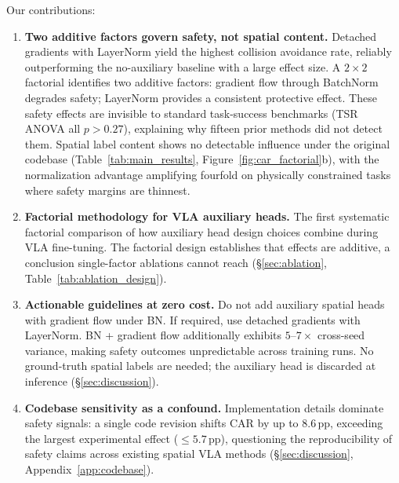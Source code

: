 Our contributions:
\begin{enumerate}[nosep,leftmargin=*]
    \item \textbf{Two additive factors govern safety, not spatial content.} Detached gradients with LayerNorm yield the highest collision avoidance rate, reliably outperforming the no-auxiliary baseline with a large effect size. A $2{\times}2$ factorial identifies two additive factors: gradient flow through BatchNorm degrades safety; LayerNorm provides a consistent protective effect. These safety effects are invisible to standard task-success benchmarks (TSR ANOVA all $p{>}0.27$), explaining why fifteen prior methods did not detect them. Spatial label content shows no detectable influence under the original codebase (Table~\ref{tab:main_results}, Figure~\ref{fig:car_factorial}b), with the normalization advantage amplifying fourfold on physically constrained tasks where safety margins are thinnest.

    \item \textbf{Factorial methodology for VLA auxiliary heads.} The first systematic factorial comparison of how auxiliary head design choices combine during VLA fine-tuning. The factorial design establishes that effects are additive, a conclusion single-factor ablations cannot reach (\S\ref{sec:ablation}, Table~\ref{tab:ablation_design}).

    \item \textbf{Actionable guidelines at zero cost.} Do not add auxiliary spatial heads with gradient flow under BN. If required, use detached gradients with LayerNorm. BN + gradient flow additionally exhibits $5$--$7{\times}$ cross-seed variance, making safety outcomes unpredictable across training runs. No ground-truth spatial labels are needed; the auxiliary head is discarded at inference (\S\ref{sec:discussion}).

    \item \textbf{Codebase sensitivity as a confound.} Implementation details dominate safety signals: a single code revision shifts CAR by up to 8.6\,pp, exceeding the largest experimental effect (${\leq}5.7$\,pp), questioning the reproducibility of safety claims across existing spatial VLA methods (\S\ref{sec:discussion}, Appendix~\ref{app:codebase}).
\end{enumerate}